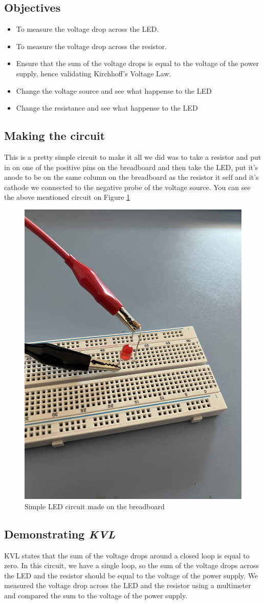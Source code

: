 \documentclass[a4paper, 10pt]{article}
\begin{document}
		\subsection{Objectives}
			\begin{itemize}
				\item To measure the voltage drop across the LED.
				\item To measure the voltage drop across the resistor.
				\item Ensure that the sum of the voltage drops is equal to the voltage of the power supply, hence validating Kirchhoff's Voltage Law.
				\item Change the voltage source and see what happense to the LED
				\item Change the resistance and see what happense to the LED
			\end{itemize}

		\subsection{Making the circuit}
			This is a pretty simple circuit to make it all we did was to take a resistor and put in on one of the positive pins on the breadboard and then take the LED,
			put it's anode to be on the same column on the breadboard as the resistor it self and it's cathode we connected to the negative probe of the voltage source.
			You can see the above mentioned circuit on Figure \ref{fig:Physical_LED_Circ}
			\begin{figure}[h!]
				\centering
				\includegraphics[width = .3\textwidth]{images/Circuit1.jpeg}
				\caption{Simple LED circuit made on the breadboard}
				\label{fig:Physical_LED_Circ}
			\end{figure}
		\pagebreak

		\subsection{Demonstrating \emph{KVL}}
			KVL states that the sum of the voltage drops around a closed loop is equal to zero. 
			In this circuit, we have a single loop, so the sum of the voltage drops across the LED and the resistor should be equal to the voltage of the power supply.
			We measured the voltage drop across the LED and the resistor using a multimeter and compared the sum to the voltage of the power supply.
\end{document}
